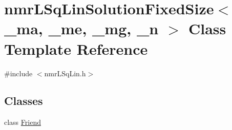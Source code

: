 \hypertarget{classnmr_l_sq_lin_solution_fixed_size}{\section{nmr\-L\-Sq\-Lin\-Solution\-Fixed\-Size$<$ \-\_\-ma, \-\_\-me, \-\_\-mg, \-\_\-n $>$ Class Template Reference}
\label{classnmr_l_sq_lin_solution_fixed_size}
}


{\ttfamily \#include $<$nmr\-L\-Sq\-Lin.\-h$>$}

\subsection*{Classes}
\begin{DoxyCompactItemize}
\item 
class \hyperlink{classnmr_l_sq_lin_solution_fixed_size_1_1_friend}{Friend}
\end{DoxyCompactItemize}
